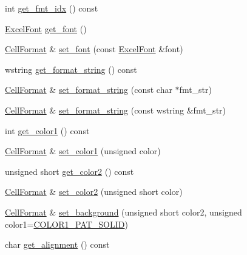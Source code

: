 \begin{DoxyCompactItemize}
\item 
int \hyperlink{struct_excel_format_1_1_cell_format_a1b557944889ef7cd493e6f6fee96a0b8}{get\+\_\+fmt\+\_\+idx} () const 
\item 
\hyperlink{struct_excel_format_1_1_excel_font}{Excel\+Font} \hyperlink{struct_excel_format_1_1_cell_format_a67fe7e97df32e192ab8e32a517f880a0}{get\+\_\+font} ()
\item 
\hyperlink{struct_excel_format_1_1_cell_format}{Cell\+Format} \& \hyperlink{struct_excel_format_1_1_cell_format_a584bde53b0699e233b3ca4e742a1fb5f}{set\+\_\+font} (const \hyperlink{struct_excel_format_1_1_excel_font}{Excel\+Font} \&font)
\item 
wstring \hyperlink{struct_excel_format_1_1_cell_format_a44e908835e6aae1c5bfda4e3adffecc7}{get\+\_\+format\+\_\+string} () const 
\item 
\hyperlink{struct_excel_format_1_1_cell_format}{Cell\+Format} \& \hyperlink{struct_excel_format_1_1_cell_format_aa4982e072d7292699e8302be63b966ba}{set\+\_\+format\+\_\+string} (const char $\ast$fmt\+\_\+str)
\item 
\hyperlink{struct_excel_format_1_1_cell_format}{Cell\+Format} \& \hyperlink{struct_excel_format_1_1_cell_format_afa1e52f7215fda94ecbf92029401fef3}{set\+\_\+format\+\_\+string} (const wstring \&fmt\+\_\+str)
\item 
int \hyperlink{struct_excel_format_1_1_cell_format_aef38f45721098661616821b754098e3b}{get\+\_\+color1} () const 
\item 
\hyperlink{struct_excel_format_1_1_cell_format}{Cell\+Format} \& \hyperlink{struct_excel_format_1_1_cell_format_a13809377fd6a57b49581dbe812e2d260}{set\+\_\+color1} (unsigned color)
\item 
unsigned short \hyperlink{struct_excel_format_1_1_cell_format_a753169625565b7f102e87e8435e29b0b}{get\+\_\+color2} () const 
\item 
\hyperlink{struct_excel_format_1_1_cell_format}{Cell\+Format} \& \hyperlink{struct_excel_format_1_1_cell_format_a072d07c3d52c584176f17a4d13a0d873}{set\+\_\+color2} (unsigned short color)
\item 
\hyperlink{struct_excel_format_1_1_cell_format}{Cell\+Format} \& \hyperlink{struct_excel_format_1_1_cell_format_ac77a06cfd205a5ffd2ef5634fda143fc}{set\+\_\+background} (unsigned short color2, unsigned color1=\hyperlink{namespace_excel_format_ac32635705247b08ca94547c6d08b9f2fa10706675844e1f7f20012859838a1409}{C\+O\+L\+O\+R1\+\_\+\+P\+A\+T\+\_\+\+S\+O\+L\+I\+D})
\item 
char \hyperlink{struct_excel_format_1_1_cell_format_ad7f9a98c1f288ec442caf1964a78394b}{get\+\_\+alignment} () const 

\end{DoxyCompactItemize}
